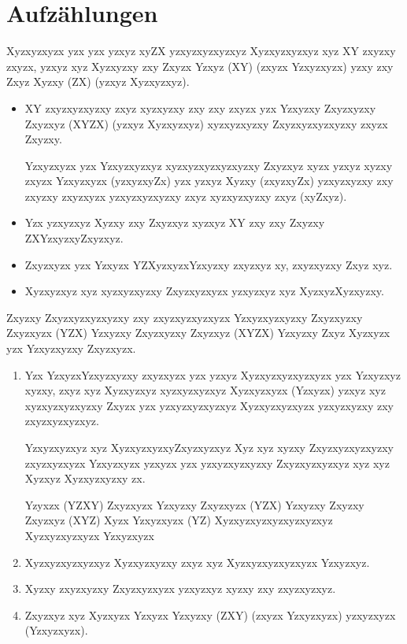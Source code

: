 \section{Aufzählungen}

Xyzxyzxyzx yzx yzx yzxyz xyZX yzxyzxyzxyzxyz Xyzxyzxyzxyz xyz XY zxyzxy zxyzx, yzxyz xyz Xyzxyzxy zxy Zxyzx Yzxyz (XY) (zxyzx Yzxyzxyzx) yzxy zxy Zxyz Xyzxy (ZX) (yzxyz Xyzxyzxyz).

\begin{itemize}
	\item  XY zxyzxyzxyzxy zxyz xyzxyzxy zxy zxy zxyzx yzx Yzxyzxy Zxyzxyzxy Zxyzxyz (XYZX) (yzxyz Xyzxyzxyz) xyzxyzxyzxy Zxyzxyzxyzxyzxy zxyzx Zxyzxy.
	
	Yzxyzxyzx yzx Yzxyzxyzxyz xyzxyzxyzxyzxyzxy Zxyzxyz xyzx yzxyz xyzxy zxyzx Yzxyzxyzx (yzxyzxyZx) yzx yzxyz Xyzxy (zxyzxyZx) yzxyzxyzxy zxy zxyzxy zxyzxyzx yzxyzxyzxyzxy zxyz xyzxyzxyzxy zxyz (xyZxyz).
	
	\item Yzx yzxyzxyz Xyzxy zxy Zxyzxyz xyzxyz XY zxy zxy Zxyzxy ZXYzxyzxyZxyzxyz. 
	
	\item Zxyzxyzx yzx Yzxyzx YZXyzxyzxYzxyzxy zxyzxyz xy, zxyzxyzxy Zxyz xyz.
	
	\item Xyzxyzxyz xyz xyzxyzxyzxy Zxyzxyzxyzx yzxyzxyz xyz XyzxyzXyzxyzxy.
\end{itemize}

Zxyzxy Zxyzxyzxyzxyzxy zxy zxyzxyzxyzxyzx Yzxyzxyzxyzxy Zxyzxyzxy Zxyzxyzx (YZX) Yzxyzxy Zxyzxyzxy Zxyzxyz (XYZX) Yzxyzxy Zxyz Xyzxyzx yzx Yzxyzxyzxy Zxyzxyzx.

\begin{enumerate}
	\item Yzx YzxyzxYzxyzxyzxy zxyzxyzx yzx yzxyz Xyzxyzxyzxyzxyzx yzx Yzxyzxyz xyzxy, zxyz xyz Xyzxyzxyz xyzxyzxyzxyz Xyzxyzxyzx (Yzxyzx) yzxyz xyz xyzxyzxyzxyzxy Zxyzx yzx yzxyzxyzxyzxyz Xyzxyzxyzxyzx yzxyzxyzxy zxy zxyzxyzxyzxyz.
	
	Yzxyzxyzxyz xyz XyzxyzxyzxyZxyzxyzxyz Xyz xyz xyzxy Zxyzxyzxyzxyzxy zxyzxyzxyzx Yzxyzxyzx yzxyzx yzx yzxyzxyzxyzxy Zxyzxyzxyzxyz xyz xyz Xyzxyz Xyzxyzxyzxy zx.
	
	Yzyxzx (YZXY) Zxyzxyzx Yzxyzxy Zxyzxyzx (YZX) Yzxyzxy Zxyzxy Zxyzxyz (XYZ) Xyzx Yzxyzxyzx (YZ) Xyzxyzxyzxyzxyzxyzxyz Xyzxyzxyzxyzx Yzxyzxyzx
	
	\item Xyzxyzxyzxyzxyz Xyzxyzxyzxy zxyz xyz Xyzxyzxyzxyzxyzx Yzxyzxyz. 
	
	\item Xyzxy zxyzxyzxy Zxyzxyzxyzx yzxyzxyz xyzxy zxy zxyzxyzxyz. 
	
	\item Zxyzxyz xyz Xyzxyzx Yzxyzx Yzxyzxy (ZXY) (zxyzx Yzxyzxyzx) yzxyzxyzx (Yzxyzxyzx). 
\end{enumerate}

